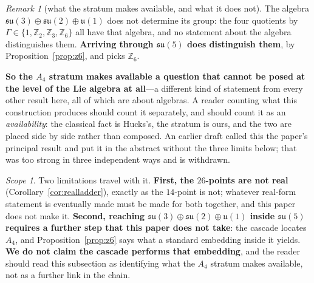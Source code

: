 \documentclass[11pt,reqno]{amsart}
\theoremstyle{plain}
\theoremstyle{definition}
\theoremstyle{remark}
\newtheorem{scope}[theorem]{Scope}
\newtheorem{remark}[theorem]{Remark}
\newcommand{\Z}{\mathbb{Z}}
\newcommand{\su}{\mathfrak{su}}
\newcommand{\uu}{\mathfrak{u}}
\begin{document}
\begin{remark}[what the stratum makes available, and what it does not]\label{rem:globalform}
The algebra $\su(3)\oplus\su(2)\oplus\uu(1)$ does not determine its group: the four
quotients by $\Gamma\in\{1,\Z_2,\Z_3,\Z_6\}$ all have that algebra, and no statement
about the algebra distinguishes them. \textbf{Arriving through $\su(5)$ does
distinguish them}, by Proposition~\ref{prop:z6}, and picks $\Z_6$.

\textbf{So the $A_4$ stratum makes available a question that cannot be posed at the level
of the Lie algebra at all}---a different kind of statement from every other result here,
all of which are about algebras. A reader counting what this construction produces should
count it separately, and should count it as an \emph{availability}: the classical fact is
Hucks's, the stratum is ours, and the two are placed side by side rather than composed.
An earlier draft called this the paper's principal result and put it in the abstract
without the three limits below; that was too strong in three independent ways and is
withdrawn.

\begin{scope}
Two limitations travel with it. \textbf{First, the $26$-points are not real}
(Corollary~\ref{cor:realladder}), exactly as the $14$-point is not; whatever real-form
statement is eventually made must be made for both together, and this paper does not
make it. \textbf{Second, reaching $\su(3)\oplus\su(2)\oplus\uu(1)$ inside
$\su(5)$ requires a further step that this paper does not take}: the cascade locates
$A_4$, and Proposition~\ref{prop:z6} says what a standard embedding inside it yields.
\textbf{We do not claim the cascade performs that embedding}, and the reader should read
this subsection as identifying what the $A_4$ stratum makes available, not as a further
link in the chain.
\end{scope}
\end{remark}
\end{document}
